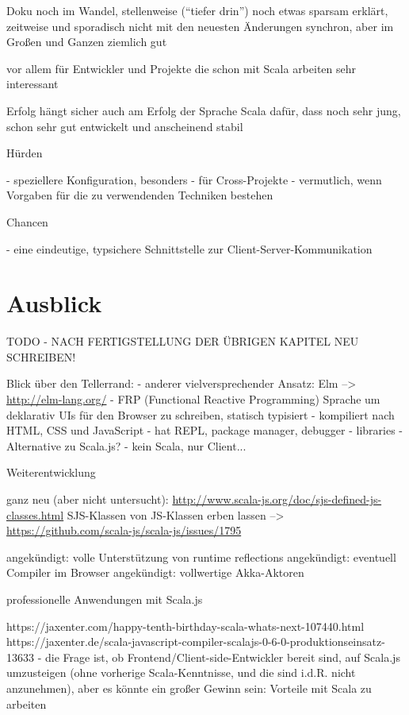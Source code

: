 \documentclass[a4paper, 12pt, hidelinks, listof=totoc, listoftables=totoc, bibliography=totoc]{scrreprt}
\begin{document}
Doku noch im Wandel, stellenweise ("`tiefer drin"') noch etwas sparsam erklärt, zeitweise und sporadisch nicht mit den neuesten Änderungen synchron, aber im Großen und Ganzen ziemlich gut

vor allem für Entwickler und Projekte die schon mit Scala arbeiten sehr interessant

Erfolg hängt sicher auch am Erfolg der Sprache Scala
dafür, dass noch sehr jung, schon sehr gut entwickelt und anscheinend stabil




Hürden

- speziellere Konfiguration, besonders
  - für Cross-Projekte
  - vermutlich, wenn Vorgaben für die zu verwendenden Techniken bestehen

Chancen

- eine eindeutige, typsichere Schnittstelle zur Client-Server-Kommunikation





\section{Ausblick}

TODO - NACH FERTIGSTELLUNG DER ÜBRIGEN KAPITEL NEU SCHREIBEN!

Blick über den Tellerrand:
- anderer vielversprechender Ansatz: Elm
	-->  \url{http://elm-lang.org/}
	- FRP (Functional Reactive Programming) Sprache um deklarativ UIs für den Browser zu schreiben, statisch typisiert
	- kompiliert nach HTML, CSS und JavaScript
	- hat REPL, package manager, debugger
	- libraries
	- Alternative zu Scala.js? - kein Scala, nur Client...



Weiterentwicklung

	ganz neu (aber nicht untersucht): \url{http://www.scala-js.org/doc/sjs-defined-js-classes.html}
	SJS-Klassen von JS-Klassen erben lassen  -->  \url{https://github.com/scala-js/scala-js/issues/1795}
	
	
	angekündigt: volle Unterstützung von runtime reflections\cite[S. 2]{doeraene2013.TDI}
	angekündigt: eventuell Compiler im Browser\cite[Folie 39, Min. 39]{doeraene2014.WHB}
	angekündigt: vollwertige Akka-Aktoren\cite[Folie 39, Min. 39]{doeraene2014.WHB}
	



professionelle Anwendungen mit Scala.js

		https://jaxenter.com/happy-tenth-birthday-scala-whats-next-107440.html
	https://jaxenter.de/scala-javascript-compiler-scalajs-0-6-0-produktionseinsatz-13633
	- die Frage ist, ob Frontend/Client-side-Entwickler bereit sind, auf Scala.js umzusteigen (ohne vorherige Scala-Kenntnisse, und die sind i.d.R. nicht anzunehmen), aber es könnte ein großer Gewinn sein: Vorteile mit Scala zu arbeiten\cite{doeraene2013.CSJ}
\end{document}
